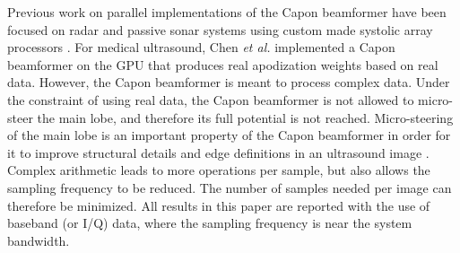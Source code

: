 \documentclass[journal]{IEEEtran}
\begin{document}
Previous work on parallel implementations of the Capon beamformer have been focused on radar and passive sonar systems using custom made systolic array processors \cite{McWhirter1989, Moonen1993, Sinha2002}. For medical ultrasound, Chen \textit{et al.} \cite{Chen2011a, Chen2011, Chen} implemented a Capon beamformer on the GPU that produces real apodization weights based on real data. However, the Capon beamformer is meant to process complex data. Under the constraint of using real data, the Capon beamformer is not allowed to micro-steer the main lobe, and therefore its full potential is not reached. Micro-steering of the main lobe is an important property of the Capon beamformer in order for it to improve structural details and edge definitions in an ultrasound image \cite[Fig~9.]{Synnevag2009}. Complex arithmetic leads to more operations per sample, but also allows the sampling frequency to be reduced. The number of samples needed per image can therefore be minimized. All results in this paper are reported with the use of baseband (or I/Q) data, where the sampling frequency is near the system bandwidth. 

\end{document}
